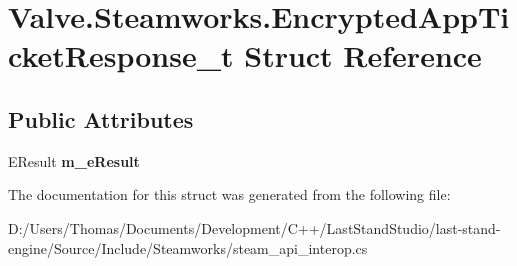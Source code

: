 \hypertarget{structValve_1_1Steamworks_1_1EncryptedAppTicketResponse__t}{}\section{Valve.\+Steamworks.\+Encrypted\+App\+Ticket\+Response\+\_\+t Struct Reference}
\label{structValve_1_1Steamworks_1_1EncryptedAppTicketResponse__t}
\subsection*{Public Attributes}
\begin{DoxyCompactItemize}
\item 
\hypertarget{structValve_1_1Steamworks_1_1EncryptedAppTicketResponse__t_a6aa1a5f004c5738b6ddae1b35f839423}{}E\+Result {\bfseries m\+\_\+e\+Result}\label{structValve_1_1Steamworks_1_1EncryptedAppTicketResponse__t_a6aa1a5f004c5738b6ddae1b35f839423}

\end{DoxyCompactItemize}


The documentation for this struct was generated from the following file\+:\begin{DoxyCompactItemize}
\item 
D\+:/\+Users/\+Thomas/\+Documents/\+Development/\+C++/\+Last\+Stand\+Studio/last-\/stand-\/engine/\+Source/\+Include/\+Steamworks/steam\+\_\+api\+\_\+interop.\+cs\end{DoxyCompactItemize}
